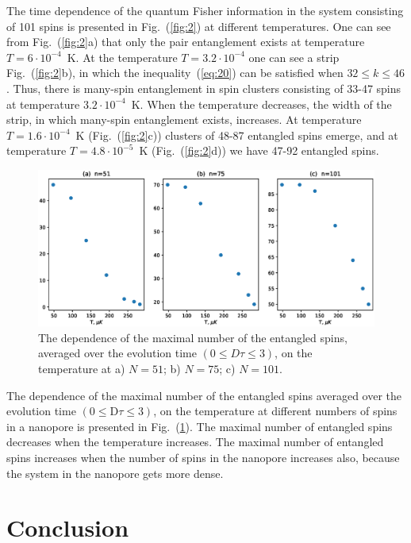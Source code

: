 \documentclass[review]{elsarticle}
\begin{document}
The time dependence of the quantum Fisher information in the system consisting of 101 spins is presented in Fig.~(\ref{fig:2}) at different temperatures. 
One can see from Fig.~(\ref{fig:2}a) that only the pair entanglement exists at temperature $T=6\cdot10^{-4}$~K.
At the temperature $T=3.2\cdot10^{-4}$ one can see a strip Fig.~(\ref{fig:2}b), in which the inequality~(\ref{eq:20}) can be satisfied when ${32}\leq {k}\leq{46}$.
Thus, there is many-spin entanglement in spin clusters consisting of 33-47 spins at temperature $3.2\cdot10^{-4}$~K.
When the temperature decreases, the width of the strip, in which many-spin entanglement exists, increases. 
At temperature $T=1.6\cdot10^{-4}$~K (Fig.~(\ref{fig:2}c)) clusters of 48-87 entangled spins emerge, and at temperature $T=4.8\cdot10^{-5}$~K (Fig.~(\ref{fig:2}d)) we have 47-92 entangled spins.

\begin{figure}
  	\includegraphics[width=0.95\linewidth]{entangled_spins_by_n.eps}
	\caption{
	    The dependence of the maximal number of the entangled spins,
	    averaged over the evolution time $(0 \leq D\tau \leq 3)$, 
	    on the temperature at a) $N=51$; b) $N=75$; c) $N=101$.
	}
	\label{fig:3}
\end{figure}

The dependence of the maximal number of the entangled spins averaged over the evolution time $({0}\leq \mathrm{D}\tau\leq{3})$, on the temperature at different numbers of spins in a nanopore is presented in Fig.~(\ref{fig:3}).
The maximal number of entangled spins decreases when the temperature increases. 
The maximal number of entangled spins increases when the number of spins in the nanopore increases also, because the system in the nanopore gets more dense. 



\section{Conclusion}
\label{sec:6}
\end{document}
